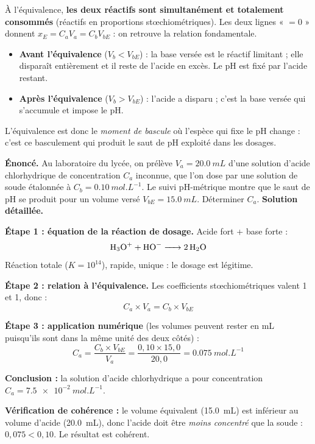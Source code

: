 \documentclass[11pt]{article}
\begin{document}
À l'équivalence, \textbf{les deux réactifs sont simultanément et totalement consommés} (réactifs en proportions stœchiométriques). Les deux lignes « $= 0$ » donnent $x_E = C_a V_a = C_b V_{bE}$ : on retrouve la relation fondamentale.

\begin{attention}
\begin{itemize}
\item \textbf{Avant l'équivalence} ($V_b < V_{bE}$) : la base versée est le réactif limitant ; elle disparaît entièrement et il reste de l'acide en excès. Le pH est fixé par l'acide restant.
\item \textbf{Après l'équivalence} ($V_b > V_{bE}$) : l'acide a disparu ; c'est la base versée qui s'accumule et impose le pH.
\end{itemize}
L'équivalence est donc le \emph{moment de bascule} où l'espèce qui fixe le pH change : c'est ce basculement qui produit le saut de pH exploité dans les dosages.
\end{attention}

\begin{exoresolu}
\textbf{Énoncé.} Au laboratoire du lycée, on prélève $V_a = \SI{20,0}{mL}$ d'une solution d'acide chlorhydrique de concentration $C_a$ inconnue, que l'on dose par une solution de soude étalonnée à $C_b = \SI{0,10}{mol.L^{-1}}$. Le suivi pH-métrique montre que le saut de pH se produit pour un volume versé $V_{bE} = \SI{15,0}{mL}$. Déterminer $C_a$.
\tcblower
\textbf{Solution détaillée.}

\textbf{Étape 1 : équation de la réaction de dosage.} Acide fort + base forte :
\[ \ce{H3O+ + HO- -> 2 H2O} \]
Réaction totale ($K = 10^{14}$), rapide, unique : le dosage est légitime.

\textbf{Étape 2 : relation à l'équivalence.} Les coefficients stœchiométriques valent 1 et 1, donc :
\[ C_a \times V_a = C_b \times V_{bE} \]

\textbf{Étape 3 : application numérique} (les volumes peuvent rester en mL puisqu'ils sont dans la même unité des deux côtés) :
\[ C_a = \frac{C_b \times V_{bE}}{V_a} = \frac{0{,}10 \times 15{,}0}{20{,}0} = \SI{0,075}{mol.L^{-1}} \]

\textbf{Conclusion :} la solution d'acide chlorhydrique a pour concentration $C_a = \SI{7,5e-2}{mol.L^{-1}}$.

\textbf{Vérification de cohérence :} le volume équivalent (\SI{15,0}{mL}) est inférieur au volume d'acide (\SI{20,0}{mL}), donc l'acide doit être \emph{moins concentré} que la soude : $0{,}075 < 0{,}10$. Le résultat est cohérent.
\end{exoresolu}
\end{document}
